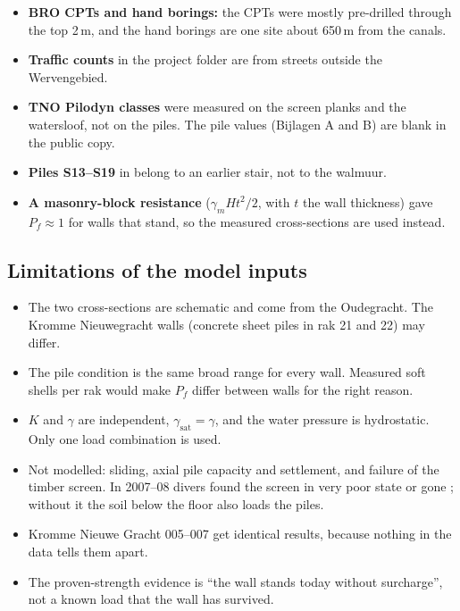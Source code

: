\begin{itemize}
  \item \textbf{BRO CPTs and hand borings:} the CPTs were mostly pre-drilled
    through the top 2\,m, and the hand borings are one site about 650\,m
    from the canals.
  \item \textbf{Traffic counts} in the project folder are from streets outside
    the Wervengebied.
  \item \textbf{TNO Pilodyn classes} \cite{tno2009} were measured on the
    screen planks and the watersloof, not on the piles. The pile values
    (Bijlagen A and B) are blank in the public copy.
  \item \textbf{Piles S13--S19} in \textcite{erfgoed156} belong to an earlier
    stair, not to the walmuur.
  \item \textbf{A masonry-block resistance} ($\gamma_m H t^2/2$, with $t$ the wall
    thickness) gave $P_f \approx 1$ for walls that
    stand, so the measured cross-sections are used instead.
\end{itemize}

\subsection{Limitations of the model inputs}\label{app:data-limits}

\begin{itemize}
  \item The two cross-sections are schematic and come from the Oudegracht.
    The Kromme Nieuwegracht walls (concrete sheet piles in rak 21 and 22) may
    differ.
  \item The pile condition is the same broad range for every wall. Measured
    soft shells per rak would make $P_f$ differ between walls for the right
    reason.
  \item $K$ and $\gamma$ are independent, $\gamma_\text{sat} = \gamma$, and the
    water pressure is hydrostatic. Only one load combination is used.
  \item Not modelled: sliding, axial pile capacity and settlement, and failure
    of the timber screen. In 2007--08 divers found the screen in very poor
    state or gone \cite{ibu2010}; without it the soil below the floor also
    loads the piles.
  \item Kromme Nieuwe Gracht 005--007 get identical results, because nothing
    in the data tells them apart.
  \item The proven-strength evidence is ``the wall stands today without
    surcharge'', not a known load that the wall has survived.
\end{itemize}
